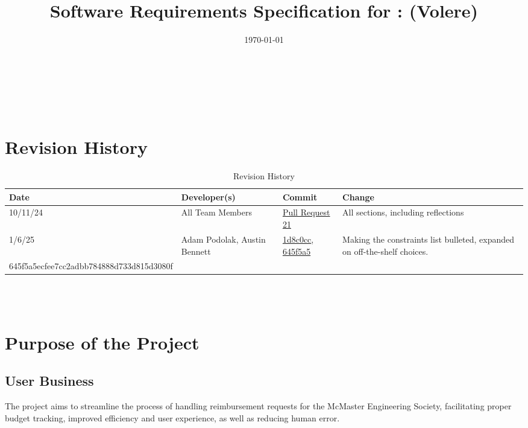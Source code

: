 \documentclass[12pt]{article}
\begin{document}
\title{Software Requirements Specification for \progname: (Volere)} 
\author{\authname}
\date{\today}
	
\maketitle

~\newpage


\tableofcontents

~\newpage

\section*{Revision History}

\begin{table}[htp]
\centering
\caption{Revision History}
\label{TblRevisionHistory}
\begin{tabularx}{\textwidth}{l l l X}
\toprule
\textbf{Date} & \textbf{Developer(s)} & \textbf{Commit} & \textbf{Change}\\

\midrule
10/11/24 & 
All Team Members & 
\href{https://github.com/ausbennett/mes-finance-platform/pull/21}{Pull Request 21} & 
All sections, including reflections\\

\midrule
1/6/25 & 
  Adam Podolak, Austin Bennett & 
\href{https://github.com/ausbennett/mes-finance-platform/commit/1d8c0cc9c631c6ca300711ce6e452f45b45c7340}{1d8c0cc}, \href{https://github.com/ausbennett/mes-finance-platform/commit/645f5a5ecfee7cc2adbb784888d733d815d3080f}{645f5a5}  & Making the constraints list bulleted, expanded on off-the-shelf choices. \\

645f5a5ecfee7cc2adbb784888d733d815d3080f

\bottomrule
\end{tabularx}
\end{table}

~\\

~\newpage
\section{Purpose of the Project}
\subsection{User Business}
The project aims to streamline the process of handling reimbursement requests for the McMaster Engineering Society, facilitating proper budget tracking, improved efficiency and user experience, as well as reducing human error.
\end{document}

